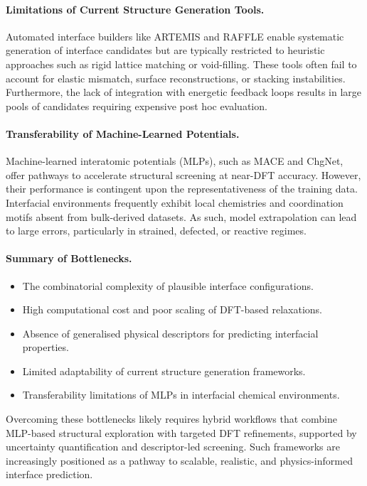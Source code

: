 \paragraph{Limitations of Current Structure Generation Tools.} Automated interface builders like ARTEMIS and RAFFLE
enable systematic generation of interface candidates but are typically restricted to heuristic approaches such as rigid
lattice matching or void-filling. These tools often fail to account for elastic mismatch, surface reconstructions, or
stacking instabilities. Furthermore, the lack of integration with energetic feedback loops results in large pools of
candidates requiring expensive post hoc evaluation.

\paragraph{Transferability of Machine-Learned Potentials.} Machine-learned interatomic potentials (MLPs), such as MACE
and ChgNet, offer pathways to accelerate structural screening at near-DFT accuracy. However, their performance is
contingent upon the representativeness of the training data. Interfacial environments frequently exhibit local
chemistries and coordination motifs absent from bulk-derived datasets. As such, model extrapolation can lead to large
errors, particularly in strained, defected, or reactive regimes.

\paragraph{Summary of Bottlenecks.}
\begin{itemize}
    \item The combinatorial complexity of plausible interface configurations.
    \item High computational cost and poor scaling of DFT-based relaxations.
    \item Absence of generalised physical descriptors for predicting interfacial properties.
    \item Limited adaptability of current structure generation frameworks.
    \item Transferability limitations of MLPs in interfacial chemical environments.
\end{itemize}

Overcoming these bottlenecks likely requires hybrid workflows that combine MLP-based structural exploration with
targeted DFT refinements, supported by uncertainty quantification and descriptor-led screening. Such frameworks are
increasingly positioned as a pathway to scalable, realistic, and physics-informed interface prediction.

